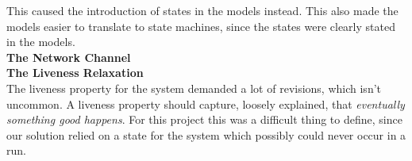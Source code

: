 This caused the introduction of states in the models instead. This also made the models easier to translate to state machines, since the states were clearly stated in the models. \\

\textbf{The Network Channel} \\




\textbf{The Liveness Relaxation} \\


The liveness property for the system demanded a lot of revisions, which isn't uncommon. A liveness property should capture, loosely explained, that \textit{eventually something good happens}. For this project this was a difficult thing to define, since our solution relied on a state for the system which possibly could never occur in a run. 














